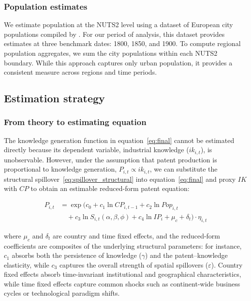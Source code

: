 \documentclass[letterpaper,12pt,leqno]{article}
\begin{document}
\subsubsection*{Population estimates}
We estimate population at the NUTS2 level using a dataset of European city populations compiled by \citet{ThePopulationofEuropeanCitiesfrom700to2000}. For our period of analysis, this dataset provides estimates at three benchmark dates: 1800, 1850, and 1900.
To compute regional population aggregates, we sum the city populations within each NUTS2 boundary. While this approach captures only urban population, it provides a consistent measure across regions and time periods.

\subsection{Estimation strategy}

\subsubsection*{From theory to estimating equation}

The knowledge generation function in equation~\eqref{eq:final} cannot be estimated directly because its dependent variable, industrial knowledge (\(ik_{i,t}\)), is unobservable. However, under the assumption that patent production is proportional to knowledge generation, \(P_{i,t} \propto ik_{i,t}\), we can substitute the structural spillover~\eqref{eq:spillover_structural} into equation~\eqref{eq:final} and proxy \(IK\) with \(CP\) to obtain an estimable reduced-form patent equation:

\begin{equation}
  \label{eq:estimable}
  \begin{split}
    P_{i,t} &= \exp\bigl(c_0 + c_1 \ln CP_{i,t-1} + c_2 \ln Pop_{i,t} \\
    &\quad + c_3 \ln S_{i,t}(\alpha, \beta, \phi) + c_4 \ln IP_i + \mu_c + \delta_t \bigr) \cdot \eta_{i,t}
  \end{split}
\end{equation}

\noindent where \(\mu_c\) and \(\delta_t\) are country and time fixed effects, and the reduced-form coefficients are composites of the underlying structural parameters: for instance, \(c_1\) absorbs both the persistence of knowledge (\(\gamma\)) and the patent--knowledge elasticity, while \(c_3\) captures the overall strength of spatial spillovers (\(\varepsilon\)). Country fixed effects absorb time-invariant institutional and geographical characteristics, while time fixed effects capture common shocks such as continent-wide business cycles or technological paradigm shifts.
\end{document}
